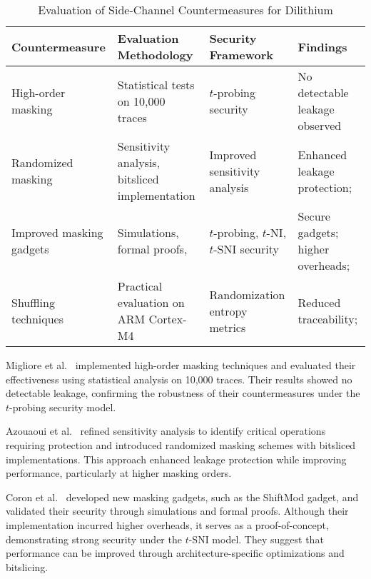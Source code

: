\begin{table}[ht]
    \centering
    \renewcommand{\arraystretch}{1.2}
    \caption{Evaluation of Side-Channel Countermeasures for Dilithium}
    \label{tab:countermeasures}
    \begin{tabularx}{\textwidth}{|Y|Y|Y|Y|}
        \hline
        {\centering\textbf{Countermeasure}\par} & {\centering\textbf{Evaluation Methodology}\par} & {\centering\textbf{Security Framework}\par} & {\centering\textbf{Findings}\par} \\ \hline
        High-order masking \cite{Migliore19}    & Statistical tests on 10,000 traces              & $t$-probing security                        & No detectable leakage observed    \\ \hline
        Randomized masking \cite{Azouaoui22}    & Sensitivity analysis, bitsliced implementation  & Improved sensitivity analysis               & Enhanced leakage protection;      \\ \hline
        Improved masking gadgets \cite{Coron23} & Simulations, formal proofs,                     & $t$-probing, $t$-NI, $t$-SNI security       & Secure gadgets; higher overheads; \\ \hline
        Shuffling techniques \cite{Ravi20}      & Practical evaluation on ARM Cortex-M4           & Randomization entropy metrics               & Reduced traceability;             \\ \hline
    \end{tabularx}
\end{table}

Migliore et al.~\cite{Migliore19} implemented high-order masking techniques and evaluated their effectiveness using statistical analysis on 10,000 traces. Their results showed no detectable leakage, confirming the robustness of their countermeasures under the $t$-probing security model.

Azouaoui et al.~\cite{Azouaoui22} refined sensitivity analysis to identify critical operations requiring protection and introduced randomized masking schemes with bitsliced implementations. This approach enhanced leakage protection while improving performance, particularly at higher masking orders.

Coron et al.~\cite{Coron23} developed new masking gadgets, such as the ShiftMod gadget, and validated their security through simulations and formal proofs. Although their implementation incurred higher overheads, it serves as a proof-of-concept, demonstrating strong security under the $t$-SNI model. They suggest that performance can be improved through architecture-specific optimizations and bitslicing.


